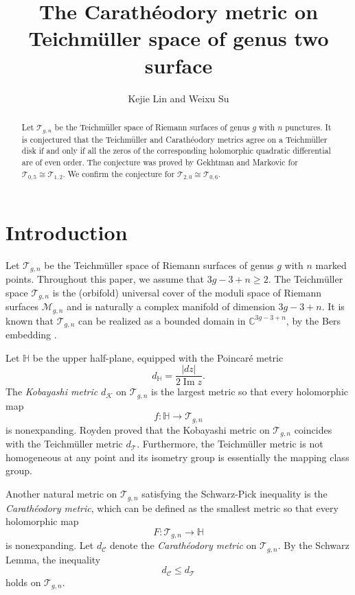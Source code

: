\documentclass[11pt]{amsart}
\title[Carath\'{e}odory metric]{The Carath\'{e}odory metric on Teichm\"uller space of genus two surface}
\author[K. Lin and W. Su]{Kejie Lin and Weixu Su}
\theoremstyle{plain}
\newcommand{\Tei}{\mathcal{T}}
\newcommand{\C}{\mathbb{C}}
\begin{document}
\maketitle

\begin{abstract}
   Let $\Tei_{g,n}$ be the Teichm\"uller space of Riemann surfaces of genus $g$
   with $n$ punctures. It is conjectured  that the Teichm\"uller and Carath\'{e}odory  metrics agree on a Teichm\"{u}ller disk  if and only if all the zeros of the corresponding holomorphic quadratic differential are of even order.  The conjecture was proved by Gekhtman and Markovic for $\Tei_{0,5}\cong \Tei_{1,2}$. We confirm the  conjecture  for $\Tei_{2,0}\cong\Tei_{0,6}$.
\end{abstract}









\section{Introduction}

Let $\Tei_{g,n}$ be the Teichm\"{u}ller space of Riemann surfaces of genus $g$ with $n$ marked points. 
Throughout this paper, we assume that $3g-3+n\geq 2$. 
The Teichm\"uller space $\Tei_{g,n}$ is the (orbifold) universal cover of the moduli space of Riemann surfaces
 $\mathcal{M}_{g,n}$ and  is naturally a complex manifold of dimension $3g-3+n$. It is known that
 $\Tei_{g,n}$ can be realized as a bounded domain in $\C^{3g-3+n}$, by the Bers
 embedding \cite{Bers}. 
 



Let $\mathbb{H}$ be the upper half-plane, equipped with the Poincar\'e metric $$d_{\mathbb{H}}= \frac{|dz|}{2 \operatorname{Im} z}.$$
The \emph{Kobayashi metric} $d_{\mathcal{K}}$ on $\Tei_{g,n}$ is the largest metric so that every holomorphic map $$f: \mathbb{H}\rightarrow\Tei_{g,n}$$ is nonexpanding.
Royden \cite{Royden1969} proved that the Kobayashi metric on $\Tei_{g,n}$ coincides with the Teichm\"{u}ller metric $d_{\mathcal{T}}$. 
Furthermore,  the Teichm\"uller metric is not homogeneous at any point and its isometry group is essentially the mapping class group.

Another natural metric on $\Tei_{g,n}$ satisfying the Schwarz-Pick inequality is the \emph{Carath\'{e}odory metric}, which can be defined as the smallest metric so that every holomorphic map $$F:  \Tei_ {g,n} \rightarrow \mathbb{H}$$ is nonexpanding.
Let $d_\mathcal{C}$ denote the \emph{Carath\'{e}odory metric} on $\Tei_{g,n}$.
 By the Schwarz Lemma, the inequality 
$$d_\mathcal{C} \leq d_\Tei$$ holds  on $\Tei_{g,n}$. 
\end{document}
